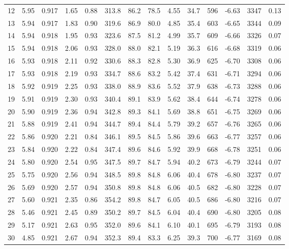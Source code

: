 \begin{table}[p!]
{\begin{minipage}{200mm}
\begin{tabular}{l l l l l l l l l l l l l l}
12	&	5.95	&	0.917	&	1.65	&	0.88	&	313.8	&	86.2	&	78.5	&	4.55	&	34.7	&	596	&	-6.63	&	3347	&	0.13\\
13	&	5.94	&	0.917	&	1.83	&	0.90	&	319.6	&	86.9	&	80.0	&	4.85	&	35.4	&	603	&	-6.65	&	3344	&	0.09\\
14	&	5.94	&	0.918	&	1.95	&	0.93	&	323.6	&	87.5	&	81.2	&	4.99	&	35.7	&	609	&	-6.66	&	3326	&	0.07\\
15	&	5.94	&	0.918	&	2.06	&	0.93	&	328.0	&	88.0	&	82.1	&	5.19	&	36.3	&	616	&	-6.68	&	3319	&	0.06\\
16	&	5.93	&	0.918	&	2.11	&	0.92	&	330.6	&	88.3	&	82.8	&	5.30	&	36.9	&	625	&	-6.70	&	3308	&	0.06\\
17	&	5.93	&	0.918	&	2.19	&	0.93	&	334.7	&	88.6	&	83.2	&	5.42	&	37.4	&	631	&	-6.71	&	3294	&	0.06\\
18	&	5.92	&	0.919	&	2.25	&	0.93	&	338.0	&	88.9	&	83.6	&	5.52	&	37.9	&	638	&	-6.73	&	3288	&	0.06\\
19	&	5.91	&	0.919	&	2.30	&	0.93	&	340.4	&	89.1	&	83.9	&	5.62	&	38.4	&	644	&	-6.74	&	3278	&	0.06\\
20	&	5.90	&	0.919	&	2.36	&	0.94	&	342.8	&	89.3	&	84.1	&	5.69	&	38.8	&	651	&	-6.75	&	3269	&	0.06\\
21	&	5.88	&	0.919	&	2.41	&	0.94	&	344.7	&	89.4	&	84.4	&	5.79	&	39.2	&	657	&	-6.76	&	3265	&	0.06\\
22	&	5.86	&	0.920	&	2.21	&	0.84	&	346.1	&	89.5	&	84.5	&	5.86	&	39.6	&	663	&	-6.77	&	3257	&	0.06\\
23	&	5.84	&	0.920	&	2.22	&	0.84	&	347.4	&	89.6	&	84.6	&	5.92	&	39.9	&	668	&	-6.78	&	3251	&	0.06\\
24	&	5.80	&	0.920	&	2.54	&	0.95	&	347.5	&	89.7	&	84.7	&	5.94	&	40.2	&	673	&	-6.79	&	3244	&	0.07\\
25	&	5.75	&	0.920	&	2.56	&	0.94	&	348.5	&	89.8	&	84.8	&	6.06	&	40.4	&	678	&	-6.80	&	3237	&	0.07\\
26	&	5.69	&	0.920	&	2.57	&	0.94	&	350.8	&	89.8	&	84.8	&	6.06	&	40.5	&	682	&	-6.80	&	3228	&	0.07\\
27	&	5.60	&	0.921	&	2.35	&	0.86	&	354.2	&	89.8	&	84.7	&	6.05	&	40.5	&	686	&	-6.80	&	3216	&	0.07\\
28	&	5.46	&	0.921	&	2.45	&	0.89	&	350.2	&	89.7	&	84.5	&	6.04	&	40.4	&	690	&	-6.80	&	3205	&	0.08\\
29	&	5.17	&	0.921	&	2.63	&	0.95	&	352.0	&	89.6	&	84.1	&	6.10	&	40.1	&	695	&	-6.79	&	3193	&	0.08\\
30	&	4.85	&	0.921	&	2.67	&	0.94	&	352.3	&	89.4	&	83.3	&	6.25	&	39.3	&	700	&	-6.77	&	3169	&	0.08\\

\end{tabular}
\end{minipage}}
\end{table}
